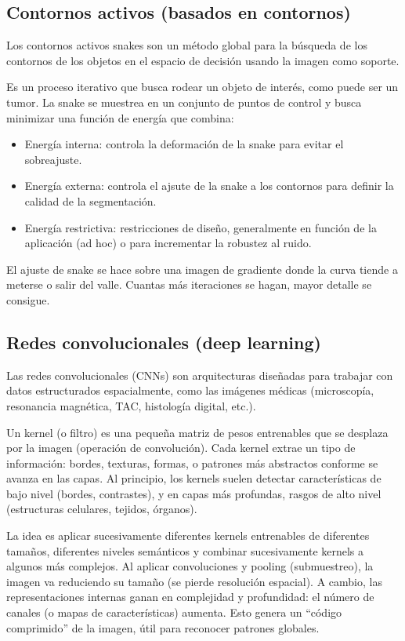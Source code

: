 \subsection{Contornos activos (basados en contornos)}
Los contornos activos snakes son un método global para la búsqueda de los contornos de los objetos en el espacio de decisión usando la imagen como soporte.

Es un proceso iterativo que busca rodear un objeto de interés, como puede ser un tumor. La snake se muestrea en un conjunto de puntos de control y busca minimizar una función de energía que combina:
\begin{itemize}
\item Energía interna: controla la deformación de la snake para evitar el sobreajuste.
\item Energía externa: controla el ajsute de la snake a los contornos para definir la calidad de la segmentación.
\item Energía restrictiva: restricciones de diseño, generalmente en función de la aplicación (ad hoc) o para incrementar la robustez al ruido.
\end{itemize}

El ajuste de snake se hace sobre una imagen de gradiente donde la curva tiende a meterse o salir del valle. Cuantas más iteraciones se hagan, mayor detalle se consigue.

\subsection{Redes convolucionales (deep learning)}
Las redes convolucionales (CNNs) son arquitecturas diseñadas para trabajar con datos estructurados espacialmente, como las imágenes médicas (microscopía, resonancia magnética, TAC, histología digital, etc.).

Un kernel (o filtro) es una pequeña matriz de pesos entrenables que se desplaza por la imagen (operación de convolución).
Cada kernel extrae un tipo de información: bordes, texturas, formas, o patrones más abstractos conforme se avanza en las capas.
Al principio, los kernels suelen detectar características de bajo nivel (bordes, contrastes), y en capas más profundas, rasgos de alto nivel (estructuras celulares, tejidos, órganos).

La idea es aplicar sucesivamente diferentes kernels entrenables de diferentes tamaños, diferentes niveles semánticos y combinar sucesivamente kernels a algunos más complejos.
Al aplicar convoluciones y pooling (submuestreo), la imagen va reduciendo su tamaño (se pierde resolución espacial). A cambio, las representaciones internas ganan en complejidad y profundidad: el número de canales (o mapas de características) aumenta. Esto genera un “código comprimido” de la imagen, útil para reconocer patrones globales.

